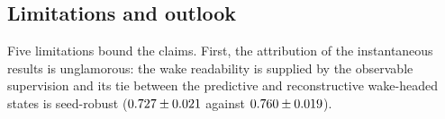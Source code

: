 \subsection{Limitations and outlook}
\label{sec:disc_limits}
\label{sec:disc_control}
\label{sec:disc_outlook}

Five limitations bound the claims. First, the attribution of the instantaneous results is unglamorous: the wake readability is supplied by the observable supervision and its tie between the predictive and reconstructive wake-headed states is seed-robust ($0.727 \pm 0.021$ against $0.760 \pm 0.019$).
